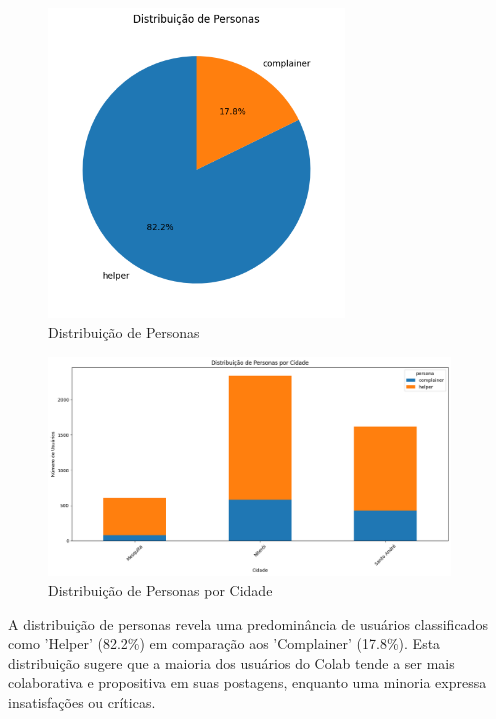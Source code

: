 \begin{figure}[htb]
    \centering
    \includegraphics[width=0.7\textwidth]{images/personas_pie.png}
    \caption{Distribuição de Personas}
    \label{fig:personas_pie}
\end{figure}

\begin{figure}[htb]
    \centering
    \includegraphics[width=0.95\textwidth]{images/personas_city.png}
    \caption{Distribuição de Personas por Cidade}
    \label{fig:personas_city}
\end{figure}

A distribuição de personas revela uma predominância de usuários classificados como 'Helper' (82.2\%) em comparação aos 'Complainer' (17.8\%). Esta distribuição sugere que a maioria dos usuários do Colab tende a ser mais colaborativa e propositiva em suas postagens, enquanto uma minoria expressa insatisfações ou críticas. 


